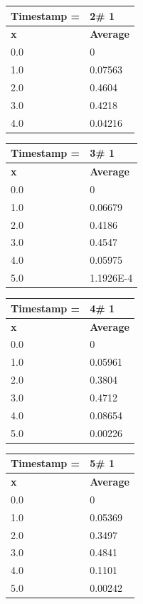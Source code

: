 \begin{tabular}{|l||l|}
\hline
\textbf{Timestamp =} & \textbf{2}\# 1\\\hline
	\textbf{x} & \textbf{Average} \\ \hline
\hline
	0.0 & 0 \\ \hline
	1.0 & 0.07563 \\ \hline
	2.0 & 0.4604 \\ \hline
	3.0 & 0.4218 \\ \hline
	4.0 & 0.04216 \\ \hline
\end{tabular}
\begin{tabular}{|l||l|}
\hline
\textbf{Timestamp =} & \textbf{3}\# 1\\\hline
	\textbf{x} & \textbf{Average} \\ \hline
\hline
	0.0 & 0 \\ \hline
	1.0 & 0.06679 \\ \hline
	2.0 & 0.4186 \\ \hline
	3.0 & 0.4547 \\ \hline
	4.0 & 0.05975 \\ \hline
	5.0 & 1.1926E-4 \\ \hline
\end{tabular}

\begin{tabular}{|l||l|}
\hline
\textbf{Timestamp =} & \textbf{4}\# 1\\\hline
	\textbf{x} & \textbf{Average} \\ \hline
\hline
	0.0 & 0 \\ \hline
	1.0 & 0.05961 \\ \hline
	2.0 & 0.3804 \\ \hline
	3.0 & 0.4712 \\ \hline
	4.0 & 0.08654 \\ \hline
	5.0 & 0.00226 \\ \hline
\end{tabular}
\begin{tabular}{|l||l|}
\hline
\textbf{Timestamp =} & \textbf{5}\# 1\\\hline
	\textbf{x} & \textbf{Average} \\ \hline
\hline
	0.0 & 0 \\ \hline
	1.0 & 0.05369 \\ \hline
	2.0 & 0.3497 \\ \hline
	3.0 & 0.4841 \\ \hline
	4.0 & 0.1101 \\ \hline
	5.0 & 0.00242 \\ \hline
\end{tabular}

